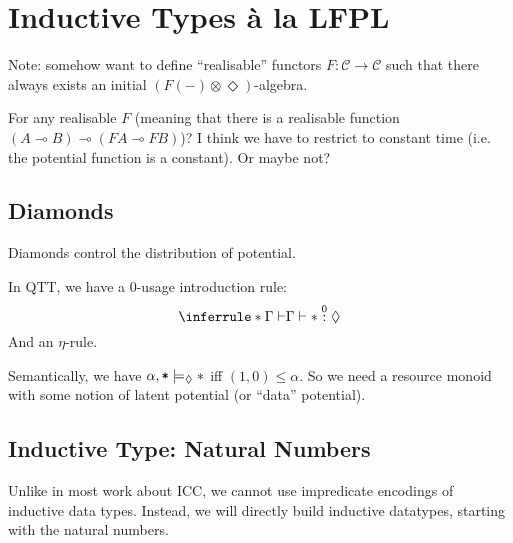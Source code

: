 \documentclass{workingnote}
\begin{document}
\section{Inductive Types \`a la LFPL}

Note: somehow want to define ``realisable'' functors
$F : \mathcal{C} \to \mathcal{C}$ such that there always exists an
initial $(F(-) \otimes \Diamond)$-algebra.

For any realisable $F$ (meaning that there is a realisable function
$(A \multimap B) \multimap (FA \multimap FB)$)? I think we have to
restrict to constant time (i.e. the potential function is a
constant). Or maybe not?

\newcommand{\unitExpr}{\mathord{*}}

\subsection{Diamonds}

Diamonds control the distribution of potential.

In QTT, we have a $0$-usage introduction rule:
\begin{displaymath}
  \inferrule*
  {\Gamma \vdash}
  {\Gamma \vdash * \stackrel{0}: \Diamond}
\end{displaymath}
And an $\eta$-rule.

Semantically, we have $\alpha, \texttt{*} \models_\Diamond *$ iff
$(1,0) \leq \alpha$. So we need a resource monoid with some notion of
latent potential (or ``data'' potential).

\subsection{Inductive Type: Natural Numbers}

Unlike in most work about ICC, we cannot use impredicate encodings of
inductive data types. Instead, we will directly build inductive
datatypes, starting with the natural numbers.
\end{document}

